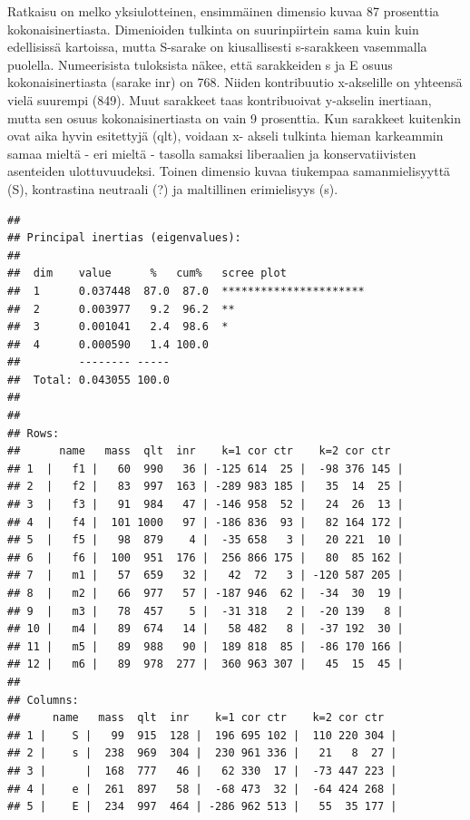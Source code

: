 \documentclass[
  finnish,
]{book}
\begin{document}
Ratkaisu on melko yksiulotteinen, ensimmäinen dimensio kuvaa 87 prosenttia
kokonaisinertiasta. Dimenioiden tulkinta on suurinpiirtein sama kuin kuin
edellisissä kartoissa, mutta S-sarake on kiusallisesti s-sarakkeen vasemmalla
puolella. Numeerisista tuloksista näkee, että sarakkeiden s ja E osuus
kokonaisinertiasta (sarake inr) on 768. Niiden kontribuutio x-akselille on
yhteensä vielä suurempi (849). Muut sarakkeet taas kontribuoivat y-akselin
inertiaan, mutta sen osuus kokonaisinertiasta on vain 9 prosenttia. Kun sarakkeet
kuitenkin ovat aika hyvin esitettyjä (qlt), voidaan x- akseli tulkinta hieman
karkeammin samaa mieltä - eri mieltä - tasolla samaksi liberaalien ja
konservatiivisten asenteiden ulottuvuudeksi. Toinen dimensio kuvaa tiukempaa
samanmielisyyttä (S), kontrastina neutraali (?) ja maltillinen erimielisyys (s).

\begin{verbatim}
## 
## Principal inertias (eigenvalues):
## 
##  dim    value      %   cum%   scree plot               
##  1      0.037448  87.0  87.0  **********************   
##  2      0.003977   9.2  96.2  **                       
##  3      0.001041   2.4  98.6  *                        
##  4      0.000590   1.4 100.0                           
##         -------- -----                                 
##  Total: 0.043055 100.0                                 
## 
## 
## Rows:
##      name   mass  qlt  inr    k=1 cor ctr    k=2 cor ctr  
## 1  |   f1 |   60  990   36 | -125 614  25 |  -98 376 145 |
## 2  |   f2 |   83  997  163 | -289 983 185 |   35  14  25 |
## 3  |   f3 |   91  984   47 | -146 958  52 |   24  26  13 |
## 4  |   f4 |  101 1000   97 | -186 836  93 |   82 164 172 |
## 5  |   f5 |   98  879    4 |  -35 658   3 |   20 221  10 |
## 6  |   f6 |  100  951  176 |  256 866 175 |   80  85 162 |
## 7  |   m1 |   57  659   32 |   42  72   3 | -120 587 205 |
## 8  |   m2 |   66  977   57 | -187 946  62 |  -34  30  19 |
## 9  |   m3 |   78  457    5 |  -31 318   2 |  -20 139   8 |
## 10 |   m4 |   89  674   14 |   58 482   8 |  -37 192  30 |
## 11 |   m5 |   89  988   90 |  189 818  85 |  -86 170 166 |
## 12 |   m6 |   89  978  277 |  360 963 307 |   45  15  45 |
## 
## Columns:
##     name   mass  qlt  inr    k=1 cor ctr    k=2 cor ctr  
## 1 |    S |   99  915  128 |  196 695 102 |  110 220 304 |
## 2 |    s |  238  969  304 |  230 961 336 |   21   8  27 |
## 3 |      |  168  777   46 |   62 330  17 |  -73 447 223 |
## 4 |    e |  261  897   58 |  -68 473  32 |  -64 424 268 |
## 5 |    E |  234  997  464 | -286 962 513 |   55  35 177 |
\end{verbatim}
\end{document}
